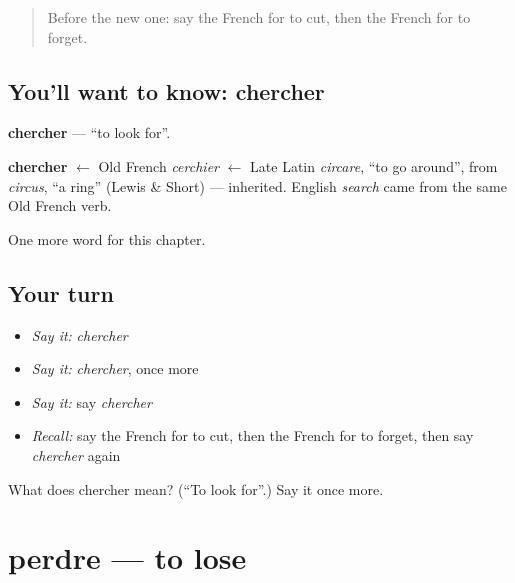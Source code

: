 \label{lesson:FR-C63-chercher}



\begin{quote}
Before the new one: say the French for to cut, then the French for to forget.
\end{quote}

\subsection*{You'll want to know: chercher}
\textbf{chercher} — \textquotedblleft{}to look for\textquotedblright{}.

\begin{cousinweb}
\textbf{chercher} $\leftarrow$ Old French \emph{cerchier} $\leftarrow$ Late Latin \emph{circare}, \textquotedblleft{}to go around\textquotedblright{}, from \emph{circus}, \textquotedblleft{}a ring\textquotedblright{} (Lewis \& Short) — inherited. English \emph{search} came from the same Old French verb.
\end{cousinweb}

\begin{grammarlens}[title={What you've built}]
One more word for this chapter.
\end{grammarlens}

\subsection*{Your turn}
\begin{itemize}
\raggedright
  \item \emph{Say it:} \emph{chercher}
  \item \emph{Say it:} \emph{chercher}, once more
  \item \emph{Say it:} say \emph{chercher}
  \item \emph{Recall:} say the French for to cut, then the French for to forget, then say \emph{chercher} again
\end{itemize}

\begin{tcolorbox}[breakable,colback=teal!4,colframe=teal!35!black,title={Before you move on}]
What does chercher mean? (\textquotedblleft{}To look for\textquotedblright{}.) Say it once more.
\end{tcolorbox}
\section[perdre]{perdre — to lose}


